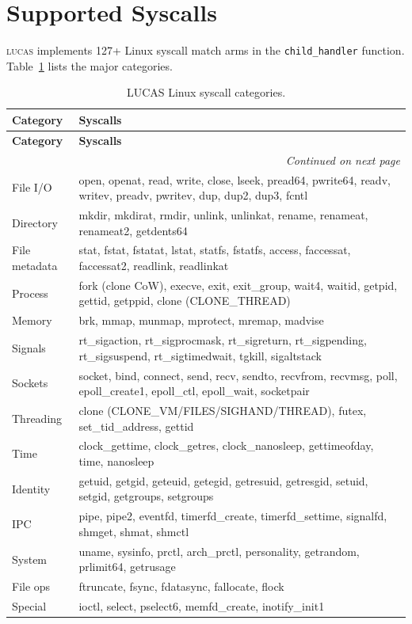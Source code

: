 \documentclass[11pt,a4paper,twoside]{report}
\theoremstyle{definition}
\newcommand{\LUCAS}{\textsc{lucas}}
\begin{document}
\section{Supported Syscalls}

\LUCAS{} implements 127+ Linux syscall match arms in the \texttt{child\_handler}
function. Table~\ref{tab:lucas-syscalls} lists the major categories.

\begin{longtable}{l p{9cm}}
\caption{LUCAS Linux syscall categories.} \label{tab:lucas-syscalls} \\
\toprule
\textbf{Category} & \textbf{Syscalls} \\
\midrule
\endfirsthead
\toprule
\textbf{Category} & \textbf{Syscalls} \\
\midrule
\endhead
\midrule
\multicolumn{2}{r}{\textit{Continued on next page}} \\
\endfoot
\bottomrule
\endlastfoot
File I/O & open, openat, read, write, close, lseek, pread64, pwrite64,
           readv, writev, preadv, pwritev, dup, dup2, dup3, fcntl \\
Directory & mkdir, mkdirat, rmdir, unlink, unlinkat, rename, renameat,
            renameat2, getdents64 \\
File metadata & stat, fstat, fstatat, lstat, statfs, fstatfs, access,
                faccessat, faccessat2, readlink, readlinkat \\
Process & fork (clone CoW), execve, exit, exit\_group, wait4, waitid,
          getpid, gettid, getppid, clone (CLONE\_THREAD) \\
Memory & brk, mmap, munmap, mprotect, mremap, madvise \\
Signals & rt\_sigaction, rt\_sigprocmask, rt\_sigreturn, rt\_sigpending,
          rt\_sigsuspend, rt\_sigtimedwait, tgkill, sigaltstack \\
Sockets & socket, bind, connect, send, recv, sendto, recvfrom, recvmsg,
          poll, epoll\_create1, epoll\_ctl, epoll\_wait, socketpair \\
Threading & clone (CLONE\_VM/FILES/SIGHAND/THREAD), futex, set\_tid\_address,
            gettid \\
Time & clock\_gettime, clock\_getres, clock\_nanosleep, gettimeofday, time,
       nanosleep \\
Identity & getuid, getgid, geteuid, getegid, getresuid, getresgid, setuid,
           setgid, getgroups, setgroups \\
IPC & pipe, pipe2, eventfd, timerfd\_create, timerfd\_settime, signalfd,
      shmget, shmat, shmctl \\
System & uname, sysinfo, prctl, arch\_prctl, personality, getrandom,
         prlimit64, getrusage \\
File ops & ftruncate, fsync, fdatasync, fallocate, flock \\
Special & ioctl, select, pselect6, memfd\_create, inotify\_init1 \\
\end{longtable}
\end{document}
